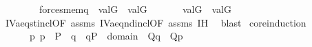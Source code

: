 \begin{isabellebody}
\ \ \ \ \ \ \ \ {\isacharparenleft}{\kern0pt}forces{\isacharunderscore}{\kern0pt}mem{\isacharparenleft}{\kern0pt}q{\isacharcomma}{\kern0pt}{\isasymsigma}{\isacharcomma}{\kern0pt}{\isasymtheta}{\isacharparenright}{\kern0pt}\ {\isasymlongrightarrow}\ val{\isacharparenleft}{\kern0pt}G{\isacharcomma}{\kern0pt}{\isasymsigma}{\isacharparenright}{\kern0pt}\ {\isasymin}\ val{\isacharparenleft}{\kern0pt}G{\isacharcomma}{\kern0pt}{\isasymtheta}{\isacharparenright}{\kern0pt}{\isacharparenright}{\kern0pt}{\isachardoublequoteclose}\isanewline
\ \ \isanewline
\ \ \ \ {\isachardoublequoteopen}val{\isacharparenleft}{\kern0pt}G{\isacharcomma}{\kern0pt}{\isasymtau}{\isacharparenright}{\kern0pt}\ {\isacharequal}{\kern0pt}\ val{\isacharparenleft}{\kern0pt}G{\isacharcomma}{\kern0pt}{\isasymtheta}{\isacharparenright}{\kern0pt}{\isachardoublequoteclose}\isanewline
%
\isadelimproof
\ \ %
\endisadelimproof
%
\isatagproof
{}\isamarkupfalse%
\ IV{}{}{}a{\isacharunderscore}{\kern0pt}eq{\isacharunderscore}{\kern0pt}{}st{\isacharunderscore}{\kern0pt}incl{\isacharbrackleft}{\kern0pt}OF\ assms{\isacharbrackright}{\kern0pt}\ IV{}{}{}a{\isacharunderscore}{\kern0pt}eq{\isacharunderscore}{\kern0pt}{}nd{\isacharunderscore}{\kern0pt}incl{\isacharbrackleft}{\kern0pt}OF\ assms{\isacharbrackright}{\kern0pt}\ IH\ \isamarkupfalse%
\ blast%
\endisatagproof
{\isafoldproof}%
%
\isadelimproof
%
\endisadelimproof
%
\isadelimdocument
%
\endisadelimdocument
%
\isatagdocument
%
\isamarkuptrue%
%
\endisatagdocument
{\isafolddocument}%
%
\isadelimdocument
%
\endisadelimdocument
{}\isamarkupfalse%
\ core{\isacharunderscore}{\kern0pt}induction{\isacharcolon}{\kern0pt}\isanewline
\ \ \isanewline
\ \ \ \ {\isachardoublequoteopen}{\isasymAnd}{\isasymtau}\ {\isasymtheta}\ p{\isachardot}{\kern0pt}\ p\ {\isasymin}\ P\ {\isasymLongrightarrow}\ {\isasymlbrakk}{\isasymAnd}q\ {\isasymsigma}{\isachardot}{\kern0pt}\ {\isasymlbrakk}q{\isasymin}P\ {\isacharsemicolon}{\kern0pt}\ {\isasymsigma}{\isasymin}domain{\isacharparenleft}{\kern0pt}{\isasymtheta}{\isacharparenright}{\kern0pt}{\isasymrbrakk}\ {\isasymLongrightarrow}\ Q{\isacharparenleft}{\kern0pt}{}{\isacharcomma}{\kern0pt}{\isasymtau}{\isacharcomma}{\kern0pt}{\isasymsigma}{\isacharcomma}{\kern0pt}q{\isacharparenright}{\kern0pt}{\isasymrbrakk}\ {\isasymLongrightarrow}\ Q{\isacharparenleft}{\kern0pt}{}{\isacharcomma}{\kern0pt}{\isasymtau}{\isacharcomma}{\kern0pt}{\isasymtheta}{\isacharcomma}{\kern0pt}p{\isacharparenright}{\kern0pt}{\isachardoublequoteclose}\isanewline

\end{isabellebody}

